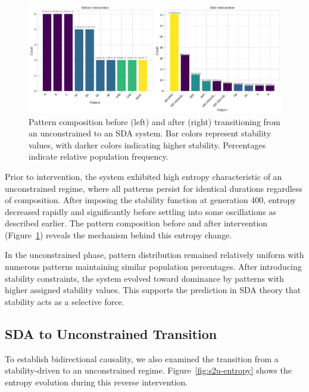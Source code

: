 \documentclass[preprint,12pt]{elsarticle}
\begin{document}
\begin{figure}[h]
    \centering
    \includegraphics[width=1\textwidth]{unconstrained_to_sda_population_comparison.png}
    \caption{Pattern composition before (left) and after (right) transitioning from an unconstrained to an SDA system. Bar colors represent stability values, with darker colors indicating higher stability. Percentages indicate relative population frequency.}
    \label{fig:u2s-patterns}
\end{figure}


Prior to intervention, the system exhibited high entropy characteristic of an unconstrained regime, where all patterns persist for identical durations regardless of composition. After imposing the stability function at generation 400, entropy decreased rapidly and significantly before settling into some oscillations as described earlier. The pattern composition before and after intervention (Figure~\ref{fig:u2s-patterns}) reveals the mechanism behind this entropy change.

In the unconstrained phase, pattern distribution remained relatively uniform with numerous patterns maintaining similar population percentages. After introducing stability constraints, the system evolved toward dominance by patterns with higher assigned stability values. This supports the prediction in SDA theory that stability acts as a selective force.

\subsection{SDA to Unconstrained Transition}
\label{subsec:sda-to-unconstrained}

To establish bidirectional causality, we also examined the transition from a stability-driven to an unconstrained regime. Figure~\ref{fig:s2u-entropy} shows the entropy evolution during this reverse intervention.
\end{document}
